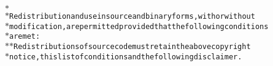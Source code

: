 {{\begin{tabbing}
{\texttt{$\ast$}}\\
{\texttt{$\ast$\hspace{6pt}Redistribution\hspace{6pt}and\hspace{6pt}use\hspace{6pt}in\hspace{6pt}source\hspace{6pt}and\hspace{6pt}binary\hspace{6pt}forms,\hspace{6pt}with\hspace{6pt}or\hspace{6pt}without}}\\
{\texttt{$\ast$\hspace{6pt}modification,\hspace{6pt}are\hspace{6pt}permitted\hspace{6pt}provided\hspace{6pt}that\hspace{6pt}the\hspace{6pt}following\hspace{6pt}conditions}}\\
{\texttt{$\ast$\hspace{6pt}are\hspace{6pt}met:}}\\
{\texttt{$\ast$\hspace{30pt}$\ast$\hspace{6pt}Redistributions\hspace{6pt}of\hspace{6pt}source\hspace{6pt}code\hspace{6pt}must\hspace{6pt}retain\hspace{6pt}the\hspace{6pt}above\hspace{6pt}copyright}}\\
{\texttt{$\ast$\hspace{42pt}notice,\hspace{6pt}this\hspace{6pt}list\hspace{6pt}of\hspace{6pt}conditions\hspace{6pt}and\hspace{6pt}the\hspace{6pt}following\hspace{6pt}disclaimer.}}\\

\end{tabbing}}}
